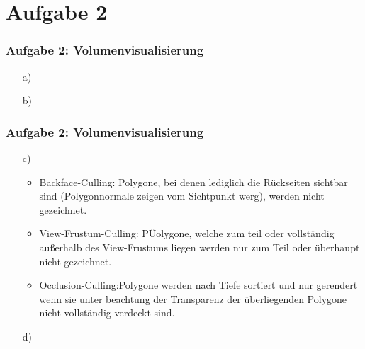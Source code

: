 \documentclass[accentcolor=tud9c,colorbacktitle,inverttitle,landscape,german,presentation,t]{tudbeamer}
\begin{document}
\section{Aufgabe 2}
\begin{frame}
	\frametitle{Aufgabe 2: Volumenvisualisierung}
			\begin{itemize}
		\item[a)] %
		
		\item[b)] %
	\end{itemize}
\end{frame}
\begin{frame}
	\frametitle{Aufgabe 2: Volumenvisualisierung}
	\begin{itemize}
		\item[c)] %
			\begin{itemize}
				\item Backface-Culling: Polygone, bei denen lediglich die Rückseiten sichtbar sind (Polygonnormale zeigen vom Sichtpunkt werg), werden nicht gezeichnet. \\
				\item View-Frustum-Culling: PÜolygone, welche zum teil oder vollständig außerhalb des View-Frustums liegen werden nur zum Teil oder überhaupt nicht gezeichnet.\\
				\item Occlusion-Culling:Polygone werden nach Tiefe sortiert und nur gerendert wenn sie unter beachtung der Transparenz der überliegenden Polygone nicht vollständig verdeckt sind.\\
			\end{itemize}
		
		\item[d)] %
	\end{itemize}
\end{frame}
\end{document}
